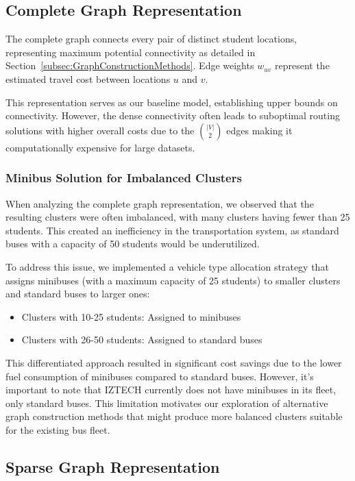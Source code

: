 \subsection{Complete Graph Representation}
\label{subsec:complete_graph}

The complete graph connects every pair of distinct student locations, representing maximum potential connectivity as detailed in Section~\ref{subsec:GraphConstructionMethods}. Edge weights $w_{uv}$ represent the estimated travel cost between locations $u$ and $v$.

This representation serves as our baseline model, establishing upper bounds on connectivity. However, the dense connectivity often leads to suboptimal routing solutions with higher overall costs due to the ${|V| \choose 2}$ edges making it computationally expensive for large datasets.

\subsubsection{Minibus Solution for Imbalanced Clusters}
\label{subsubsec:minibus_solution}

When analyzing the complete graph representation, we observed that the resulting clusters were often imbalanced, with many clusters having fewer than 25 students. This created an inefficiency in the transportation system, as standard buses with a capacity of 50 students would be underutilized.

To address this issue, we implemented a vehicle type allocation strategy that assigns minibuses (with a maximum capacity of 25 students) to smaller clusters and standard buses to larger ones:

\begin{itemize}
    \item Clusters with 10-25 students: Assigned to minibuses
    \item Clusters with 26-50 students: Assigned to standard buses
\end{itemize}

This differentiated approach resulted in significant cost savings due to the lower fuel consumption of minibuses compared to standard buses. However, it's important to note that IZTECH currently does not have minibuses in its fleet, only standard buses. This limitation motivates our exploration of alternative graph construction methods that might produce more balanced clusters suitable for the existing bus fleet.

\subsection{Sparse Graph Representation}
\label{subsec:sparse_graph}

